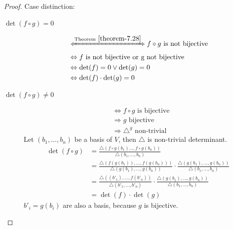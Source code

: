 \documentclass[a4paper,landscape,twocolumn]{article}
\theoremstyle{definition}
\begin{document}
\begin{proof}
  Case distinction:
  \begin{description}
    \item[$\det(f \circ g) = 0$]
      \begin{align*}
        &\xLeftrightarrow{\text{Theorem}~\ref{theorem-7.28}} f \circ g \text{ is not bijective} \\
        &\Leftrightarrow f \text{ is not bijective or g not bijective}  \\
        &\Leftrightarrow \det(f) = 0 \lor \det(g) = 0 \\
        &\Leftrightarrow \det(f) \cdot \det(g) = 0
      \end{align*}
    \item[$\det(f \circ g) \neq 0$]
      \begin{align*}
        &\Leftrightarrow f \circ g \text{ is bijective} \\
        &\Rightarrow g \text{ bijective} \\
        &\Rightarrow \triangle^g \text{ non-trivial}
      \end{align*}
      Let $(b_1, \ldots, b_n)$ be a basis of $V$, then $\triangle$ is non-trivial determinant.
      \begin{align*}
        \det(f \circ g)
          &= \frac{\triangle(f\circ g(b_1) \ldots, f \circ g(b_n))}{\triangle (b_1, \ldots, b_n)} \\
          &= \frac{\triangle(f(g(b_1)), \ldots, f(g(b_n)))}{\triangle (g(b_1), \ldots, g(b_n))} \cdot \frac{\triangle (g(b_1), \ldots, g(b_n))}{\triangle(b_1, \ldots, b_n)} \\
          &= \frac{\triangle((b'_1), \ldots, f(b'_n))}{\triangle (b'_1, \ldots, b'_n)} \cdot \frac{\triangle (g(b_1), \ldots, g(b_n))}{\triangle(b_1, \ldots, b_n)} \\
          &= \det(f) \cdot \det(g)
      \end{align*}
      $b'_i = g(b_i)$ are also a basis, because $g$ is bijective.
  \end{description}
\end{proof}
\end{document}
